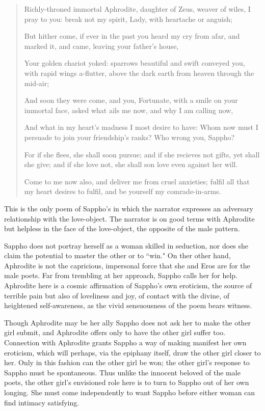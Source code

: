 \begin{quotation}
    Richly-throned immortal Aphrodite, daughter of Zeus, weaver of wiles, I pray to you: break not my spirit, Lady, with heartache or anguish;

    But hither come, if ever in the past you heard my cry from afar, and marked it, and came, leaving your father's house,

    Your golden chariot yoked: sparrows beautiful and swift conveyed you, with rapid wings a-flutter, above the dark earth from heaven through the mid-air;

    And soon they were come, and you, Fortunate, with a smile on your immortal face, asked what ails me now, and why I am calling now,

    And what in my heart's madness I most desire to have: Whom now must I persuade to join your friendship's ranks? Who wrong you, Sappho?

    For if she flees, she shall soon pursue; and if she recieves not gifts, yet shall she give; and if she love not, she shall son love even against her will.

    Come to me now also, and deliver me from cruel anxieties; fulfil all that my heart desires to fulfil, and be yourself my comrade-in-arms.
\end{quotation}

This is the only poem of Sappho's in which the narrator expresses an adversary relationship with the love-object. The narrator is on good terms with Aphrodite but helpless in the face of the love-object, the opposite of the male pattern. 

\begin{nte}
    Sappho does not portray herself as a woman skilled in seduction, nor does she claim the potential to master the other or to ``win." On ther other hand, Aphrodite is not the capricious, impersonal force that she and Eros are for the male poets. Far from trembling at her approach, Sappho calls her for help. Aphrodite here is a cosmic affirmation of Sappho's own eroticism, the source of terrible pain but also of loveliness and joy, of contact with the divine, of heightened self-awareness, as the vivid sensuousness of the poem bears witness.
\end{nte}

Though Aphrodite may be her ally Sappho does not ask her to make the other girl submit, and Aphrodite offers only to have the other girl suffer too. Connection with Aphrodite grants Sappho a way of making manifest her own eroticism, which will perhaps, via the epiphany itself, draw the other girl closer to her. Only in this fashion can the other girl be won; the other girl's response to Sappho must be spontaneous. Thus unlike the innocent beloved of the male poets, the other girl's envisioned role here is to turn to Sappho out of her own longing. She must come independently to want Sappho before either woman can find intimacy satisfying.

